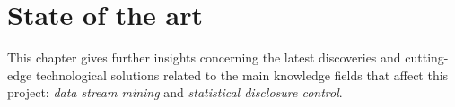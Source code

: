 \chapter{State of the art} %
\label{Chapter3StateOfTheArt} %


This chapter gives further insights concerning the latest discoveries and cutting-edge technological solutions related to the main knowledge fields that affect this project: \textit{data stream mining} and \textit{statistical disclosure control}.



